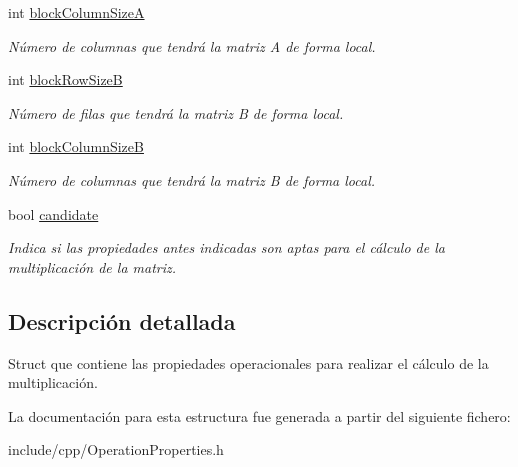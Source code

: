 \begin{DoxyCompactItemize}
int \hyperlink{structOperationProperties_a2a4e92bd14269db5a449fb4a49ad6cd3}{block\+Column\+SizeA}
\begin{DoxyCompactList}\small\item\em Número de columnas que tendrá la matriz A de forma local. \end{DoxyCompactList}\item 
\mbox{\label{structOperationProperties_a73c3c9069b04bbf5000d9865862658ee}} 
int \hyperlink{structOperationProperties_a73c3c9069b04bbf5000d9865862658ee}{block\+Row\+SizeB}
\begin{DoxyCompactList}\small\item\em Número de filas que tendrá la matriz B de forma local. \end{DoxyCompactList}\item 
\mbox{\label{structOperationProperties_adfc857d6acc93f1972dcb219df2c5ec6}} 
int \hyperlink{structOperationProperties_adfc857d6acc93f1972dcb219df2c5ec6}{block\+Column\+SizeB}
\begin{DoxyCompactList}\small\item\em Número de columnas que tendrá la matriz B de forma local. \end{DoxyCompactList}\item 
\mbox{\label{structOperationProperties_af89330af317c0a31389401a4b7f0894b}} 
bool \hyperlink{structOperationProperties_af89330af317c0a31389401a4b7f0894b}{candidate}
\begin{DoxyCompactList}\small\item\em Indica si las propiedades antes indicadas son aptas para el cálculo de la multiplicación de la matriz. \end{DoxyCompactList}\end{DoxyCompactItemize}


\subsection{Descripción detallada}
Struct que contiene las propiedades operacionales para realizar el cálculo de la multiplicación. 

La documentación para esta estructura fue generada a partir del siguiente fichero\+:\begin{DoxyCompactItemize}
\item 
include/cpp/Operation\+Properties.\+h\end{DoxyCompactItemize}
